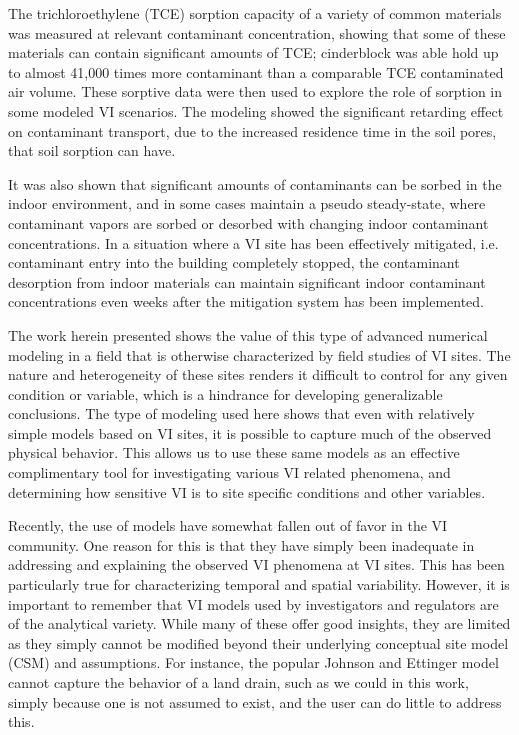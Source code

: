 The trichloroethylene (TCE) sorption capacity of a variety of common materials was measured at relevant contaminant concentration, showing that some of these materials can contain significant amounts of TCE; cinderblock was able hold up to almost 41,000 times more contaminant than a comparable TCE contaminated air volume.
These sorptive data were then used to explore the role of sorption in some modeled VI scenarios.
The modeling showed the significant retarding effect on contaminant transport, due to the increased residence time in the soil pores, that soil sorption can have.\par

It was also shown that significant amounts of contaminants can be sorbed in the indoor environment, and in some cases maintain a pseudo steady-state, where contaminant vapors are sorbed or desorbed with changing indoor contaminant concentrations.
In a situation where a VI site has been effectively mitigated, i.e. contaminant entry into the building completely stopped, the contaminant desorption from indoor materials can maintain significant indoor contaminant concentrations even weeks after the mitigation system has been implemented.\par

The work herein presented shows the value of this type of advanced numerical modeling in a field that is otherwise characterized by field studies of VI sites.
The nature and heterogeneity of these sites renders it difficult to control for any given condition or variable, which is a hindrance for developing generalizable conclusions.
The type of modeling used here shows that even with relatively simple models based on VI sites, it is possible to capture much of the observed physical behavior.
This allows us to use these same models as an effective complimentary tool for investigating various VI related phenomena, and determining how sensitive VI is to site specific conditions and other variables.\par

Recently, the use of models have somewhat fallen out of favor in the VI community.
One reason for this is that they have simply been inadequate in addressing and explaining the observed VI phenomena at VI sites.
This has been particularly true for characterizing temporal and spatial variability.
However, it is important to remember that VI models used by investigators and regulators are of the analytical variety.
While many of these offer good insights, they are limited as they simply cannot be modified beyond their underlying conceptual site model (CSM) and assumptions.
For instance, the popular Johnson and Ettinger model cannot capture the behavior of a land drain, such as we could in this work, simply because one is not assumed to exist, and the user can do little to address this.\par

